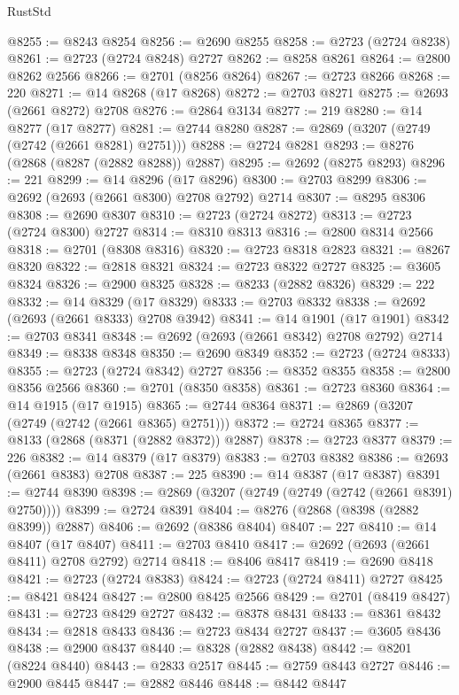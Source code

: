 \begin{lexlean}{RustStd}
\begin{coremodule}
@8255 := @8243 @8254
@8256 := @2690 @8255
@8258 := @2723 (@2724 @8238)
@8261 := @2723 (@2724 @8248) @2727
@8262 := @8258 @8261
@8264 := @2800 @8262 @2566
@8266 := @2701 (@8256 @8264)
@8267 := @2723 @8266
@8268 := 220
@8271 := @14 @8268 (@17 @8268)
@8272 := @2703 @8271
@8275 := @2693 (@2661 @8272) @2708
@8276 := @2864 @3134
@8277 := 219
@8280 := @14 @8277 (@17 @8277)
@8281 := @2744 @8280
@8287 := @2869 (@3207 (@2749 (@2742 (@2661 @8281) @2751)))
@8288 := @2724 @8281
@8293 := @8276 (@2868 (@8287 (@2882 @8288)) @2887)
@8295 := @2692 (@8275 @8293)
@8296 := 221
@8299 := @14 @8296 (@17 @8296)
@8300 := @2703 @8299
@8306 := @2692 (@2693 (@2661 @8300) @2708 @2792) @2714
@8307 := @8295 @8306
@8308 := @2690 @8307
@8310 := @2723 (@2724 @8272)
@8313 := @2723 (@2724 @8300) @2727
@8314 := @8310 @8313
@8316 := @2800 @8314 @2566
@8318 := @2701 (@8308 @8316)
@8320 := @2723 @8318 @2823
@8321 := @8267 @8320
@8322 := @2818 @8321
@8324 := @2723 @8322 @2727
@8325 := @3605 @8324
@8326 := @2900 @8325
@8328 := @8233 (@2882 @8326)
@8329 := 222
@8332 := @14 @8329 (@17 @8329)
@8333 := @2703 @8332
@8338 := @2692 (@2693 (@2661 @8333) @2708 @3942)
@8341 := @14 @1901 (@17 @1901)
@8342 := @2703 @8341
@8348 := @2692 (@2693 (@2661 @8342) @2708 @2792) @2714
@8349 := @8338 @8348
@8350 := @2690 @8349
@8352 := @2723 (@2724 @8333)
@8355 := @2723 (@2724 @8342) @2727
@8356 := @8352 @8355
@8358 := @2800 @8356 @2566
@8360 := @2701 (@8350 @8358)
@8361 := @2723 @8360
@8364 := @14 @1915 (@17 @1915)
@8365 := @2744 @8364
@8371 := @2869 (@3207 (@2749 (@2742 (@2661 @8365) @2751)))
@8372 := @2724 @8365
@8377 := @8133 (@2868 (@8371 (@2882 @8372)) @2887)
@8378 := @2723 @8377
@8379 := 226
@8382 := @14 @8379 (@17 @8379)
@8383 := @2703 @8382
@8386 := @2693 (@2661 @8383) @2708
@8387 := 225
@8390 := @14 @8387 (@17 @8387)
@8391 := @2744 @8390
@8398 := @2869 (@3207 (@2749 (@2749 (@2742 (@2661 @8391) @2750))))
@8399 := @2724 @8391
@8404 := @8276 (@2868 (@8398 (@2882 @8399)) @2887)
@8406 := @2692 (@8386 @8404)
@8407 := 227
@8410 := @14 @8407 (@17 @8407)
@8411 := @2703 @8410
@8417 := @2692 (@2693 (@2661 @8411) @2708 @2792) @2714
@8418 := @8406 @8417
@8419 := @2690 @8418
@8421 := @2723 (@2724 @8383)
@8424 := @2723 (@2724 @8411) @2727
@8425 := @8421 @8424
@8427 := @2800 @8425 @2566
@8429 := @2701 (@8419 @8427)
@8431 := @2723 @8429 @2727
@8432 := @8378 @8431
@8433 := @8361 @8432
@8434 := @2818 @8433
@8436 := @2723 @8434 @2727
@8437 := @3605 @8436
@8438 := @2900 @8437
@8440 := @8328 (@2882 @8438)
@8442 := @8201 (@8224 @8440)
@8443 := @2833 @2517
@8445 := @2759 @8443 @2727
@8446 := @2900 @8445
@8447 := @2882 @8446
@8448 := @8442 @8447

\end{coremodule}
\end{lexlean}
